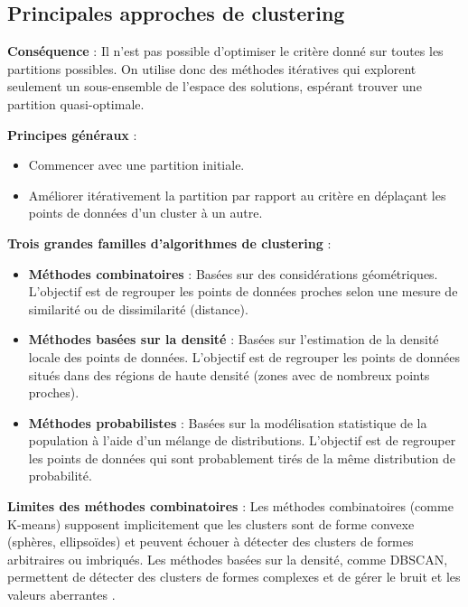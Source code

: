\documentclass[10pt,a4paper]{article}
\begin{document}
\subsection*{Principales approches de clustering}

\textbf{Conséquence} : Il n'est pas possible d'optimiser le critère donné sur toutes les partitions possibles. On utilise donc des méthodes itératives qui explorent seulement un sous-ensemble de l'espace des solutions, espérant trouver une partition quasi-optimale.

\textbf{Principes généraux} :
\begin{itemize}
    \item Commencer avec une partition initiale.
    \item Améliorer itérativement la partition par rapport au critère en déplaçant les points de données d'un cluster à un autre.
\end{itemize}

\textbf{Trois grandes familles d'algorithmes de clustering} :
\begin{itemize}
    \item \textbf{Méthodes combinatoires} : Basées sur des considérations géométriques. L'objectif est de regrouper les points de données proches selon une mesure de similarité ou de dissimilarité (distance).
    \item \textbf{Méthodes basées sur la densité} : Basées sur l'estimation de la densité locale des points de données. L'objectif est de regrouper les points de données situés dans des régions de haute densité (zones avec de nombreux points proches).
    \item \textbf{Méthodes probabilistes} : Basées sur la modélisation statistique de la population à l'aide d'un mélange de distributions. L'objectif est de regrouper les points de données qui sont probablement tirés de la même distribution de probabilité.
\end{itemize}

\textbf{Limites des méthodes combinatoires} :
Les méthodes combinatoires (comme K-means) supposent implicitement que les clusters sont de forme convexe (sphères, ellipsoïdes) et peuvent échouer à détecter des clusters de formes arbitraires ou imbriqués. Les méthodes basées sur la densité, comme DBSCAN, permettent de détecter des clusters de formes complexes et de gérer le bruit et les valeurs aberrantes \cite{scikit-learn-dbscan, wikipedia-dbscan}.
\end{document}

